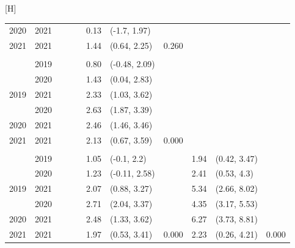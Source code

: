 \documentclass[
  letterpaper,
  DIV=11,
  numbers=noendperiod]{scrartcl}
\makeatletter
\renewenvironment{table}%
   {\renewcommand\familydefault\sfdefault
    \@float{table}}
   {\end@float}
\makeatother
\begin{document}
\begin{table}[H]
\begin{tabular}{rrrllrllrll}
\cmidrule{2-11}
\multirow[t]{-2}{*}{\raggedleft\arraybackslash \hspace{1em}2020} & 2021 &  &  &  & 0.13 & (-1.7, 1.97) &  &  &  & \\
\cmidrule{1-11}
\hspace{1em}2021 & 2021 &  &  &  & 1.44 & (0.64, 2.25) & 0.260 &  &  & \\
\cmidrule{1-11}
\addlinespace[0.3em]
\multicolumn{11}{l}{\textbf{Daytime heating}}\\
 & 2019 &  &  &  & 0.80 & (-0.48, 2.09) &  &  &  & \\
\cmidrule{2-11}
 & 2020 &  &  &  & 1.43 & (0.04, 2.83) &  &  &  & \\
\cmidrule{2-11}
\multirow[t]{-3}{*}{\raggedleft\arraybackslash \hspace{1em}2019} & 2021 &  &  &  & 2.33 & (1.03, 3.62) &  &  &  & \\
\cmidrule{1-11}
 & 2020 &  &  &  & 2.63 & (1.87, 3.39) &  &  &  & \\
\cmidrule{2-11}
\multirow[t]{-2}{*}{\raggedleft\arraybackslash \hspace{1em}2020} & 2021 &  &  &  & 2.46 & (1.46, 3.46) &  &  &  & \\
\cmidrule{1-11}
\hspace{1em}2021 & 2021 &  &  &  & 2.13 & (0.67, 3.59) & 0.000 &  &  & \\
\cmidrule{1-11}
\addlinespace[0.3em]
\multicolumn{11}{l}{\textbf{Heating season}}\\
 & 2019 &  &  &  & 1.05 & (-0.1, 2.2) &  & 1.94 & (0.42, 3.47) & \\
\cmidrule{2-11}
 & 2020 &  &  &  & 1.23 & (-0.11, 2.58) &  & 2.41 & (0.53, 4.3) & \\
\cmidrule{2-11}
\multirow[t]{-3}{*}{\raggedleft\arraybackslash \hspace{1em}2019} & 2021 &  &  &  & 2.07 & (0.88, 3.27) &  & 5.34 & (2.66, 8.02) & \\
\cmidrule{1-11}
 & 2020 &  &  &  & 2.71 & (2.04, 3.37) &  & 4.35 & (3.17, 5.53) & \\
\cmidrule{2-11}
\multirow[t]{-2}{*}{\raggedleft\arraybackslash \hspace{1em}2020} & 2021 &  &  &  & 2.48 & (1.33, 3.62) &  & 6.27 & (3.73, 8.81) & \\
\cmidrule{1-11}
\hspace{1em}2021 & 2021 &  &  &  & 1.97 & (0.53, 3.41) & 0.000 & 2.23 & (0.26, 4.21) & 0.000\\
\bottomrule
\end{tabular}
\endgroup{}
\end{table}
\end{document}
